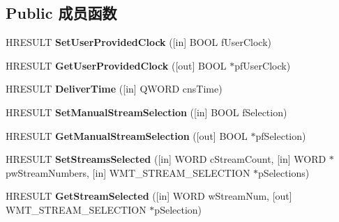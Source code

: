\subsection*{Public 成员函数}
\begin{DoxyCompactItemize}
\item 
\mbox{\label{interface_i_w_m_reader_advanced_a62e51ae2c46696cd69d328750ba2f3bd}} 
H\+R\+E\+S\+U\+LT {\bfseries Set\+User\+Provided\+Clock} (\mbox{[}in\mbox{]} B\+O\+OL f\+User\+Clock)
\item 
\mbox{\label{interface_i_w_m_reader_advanced_add252baabe18ef496ab97ddb91292b18}} 
H\+R\+E\+S\+U\+LT {\bfseries Get\+User\+Provided\+Clock} (\mbox{[}out\mbox{]} B\+O\+OL $\ast$pf\+User\+Clock)
\item 
\mbox{\label{interface_i_w_m_reader_advanced_af2cc00574147708e295298616004c583}} 
H\+R\+E\+S\+U\+LT {\bfseries Deliver\+Time} (\mbox{[}in\mbox{]} Q\+W\+O\+RD cns\+Time)
\item 
\mbox{\label{interface_i_w_m_reader_advanced_a5d66cebc499203cfa2fd580f04aa268c}} 
H\+R\+E\+S\+U\+LT {\bfseries Set\+Manual\+Stream\+Selection} (\mbox{[}in\mbox{]} B\+O\+OL f\+Selection)
\item 
\mbox{\label{interface_i_w_m_reader_advanced_a35346399a8a973177d1bf096e156a40c}} 
H\+R\+E\+S\+U\+LT {\bfseries Get\+Manual\+Stream\+Selection} (\mbox{[}out\mbox{]} B\+O\+OL $\ast$pf\+Selection)
\item 
\mbox{\label{interface_i_w_m_reader_advanced_a045c71271e1ea7fdb4b771a14eb2f905}} 
H\+R\+E\+S\+U\+LT {\bfseries Set\+Streams\+Selected} (\mbox{[}in\mbox{]} W\+O\+RD c\+Stream\+Count, \mbox{[}in\mbox{]} W\+O\+RD $\ast$pw\+Stream\+Numbers, \mbox{[}in\mbox{]} W\+M\+T\+\_\+\+S\+T\+R\+E\+A\+M\+\_\+\+S\+E\+L\+E\+C\+T\+I\+ON $\ast$p\+Selections)
\item 
\mbox{\label{interface_i_w_m_reader_advanced_af0ec6977e88e0ad92057eb7809a8c900}} 
H\+R\+E\+S\+U\+LT {\bfseries Get\+Stream\+Selected} (\mbox{[}in\mbox{]} W\+O\+RD w\+Stream\+Num, \mbox{[}out\mbox{]} W\+M\+T\+\_\+\+S\+T\+R\+E\+A\+M\+\_\+\+S\+E\+L\+E\+C\+T\+I\+ON $\ast$p\+Selection)

\end{DoxyCompactItemize}
